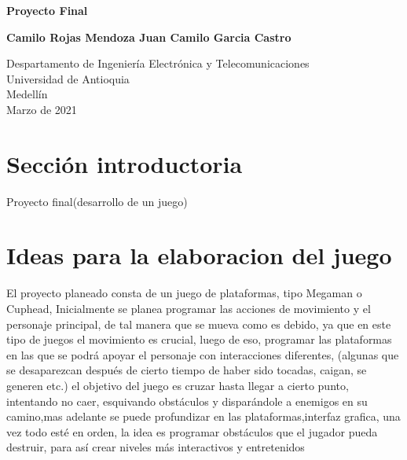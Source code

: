\documentclass{article}
\begin{document}
\begin{titlepage}
    \begin{center}
        \vspace*{1cm}
            
        \Huge
        \textbf{Proyecto Final}
            
        
        \vspace{1.5cm}
            
        \textbf{Camilo Rojas Mendoza
        Juan Camilo Garcia Castro}
            
        \vfill
            
        \vspace{0.8cm}
            
        \Large
        Despartamento de Ingeniería Electrónica y Telecomunicaciones\\
        Universidad de Antioquia\\
        Medellín\\
        Marzo de 2021
            
    \end{center}
\end{titlepage}

\tableofcontents
\newpage
\section{Sección introductoria}\label{intro}
Proyecto final(desarrollo de un juego)

\section{Ideas para la elaboracion del juego} \label{contenido}
El proyecto planeado consta de un juego de plataformas, tipo Megaman o Cuphead, Inicialmente se planea programar las acciones de movimiento y el personaje principal, de tal manera que se mueva como es debido, ya que en este tipo de juegos el movimiento es crucial, luego de eso, programar las plataformas en las que se podrá apoyar el personaje con interacciones diferentes, (algunas que se desaparezcan después de cierto tiempo de haber sido tocadas, caigan, se generen etc.) el objetivo del juego es cruzar hasta llegar a cierto punto, intentando no caer, esquivando obstáculos y disparándole a enemigos en su camino,mas adelante se puede profundizar en las plataformas,interfaz grafica, una vez todo esté en orden, la idea es programar obstáculos que el jugador pueda destruir, para así crear niveles más interactivos y entretenidos
\end{document}
